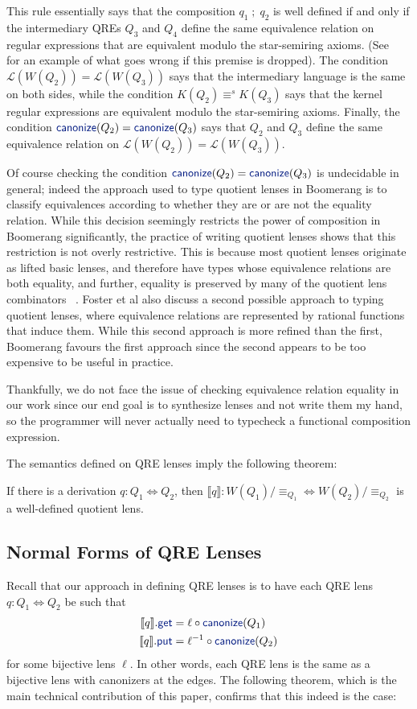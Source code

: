 \documentclass[acmsmall,review,anonymous]{acmart}
\newcommand{\kw}[1]{\textcolor{dkblue}{\ensuremath{\mathsf{#1}}}}
\newcommand{\eqrel}[1]{\ensuremath{\equiv_{#1}}}
\newcommand{\canonize}{\ensuremath{\kw{canonize}}}
\newcommand{\get}{\ensuremath{\kw{get}}}
\newcommand{\lput}{\ensuremath{\kw{put}}}
\begin{document}
This rule essentially says that the composition $q_1 \; ; \; q_2$ is well
defined if and only if the intermediary QREs $Q_3$ and $Q_4$ define the same
equivalence relation on regular expressions that are equivalent modulo the
star-semiring axioms. (See~\cite[\S 4]{quotientlenses} for an example of what
goes wrong if this premise is dropped). The condition $\mathcal{L}(W(Q_2)) =
\mathcal{L}(W(Q_3))$ says that the intermediary language is the same on both
sides, while the condition $K(Q_2) \equiv^s K(Q_3)$ says that the kernel
regular expressions are equivalent modulo the star-semiring axioms. Finally,
the condition $\canonize(Q_2) = \canonize(Q_3)$ says that $Q_2$ and $Q_3$
define the same equivalence relation on $\mathcal{L}(W(Q_2))=
\mathcal{L}(W(Q_3))$.

Of course checking the condition $\canonize(Q_2) = \canonize(Q_3)$ is
undecidable in general; indeed the approach used to type quotient lenses in
Boomerang is to classify equivalences according to whether they are or are not
the equality relation. While this decision seemingly restricts the
power of composition in Boomerang significantly, the practice of writing
quotient lenses shows that this restriction is not overly restrictive. This is 
because most quotient lenses originate as lifted basic lenses, and
therefore have types whose equivalence relations are both equality, and further,
equality is preserved by many of the quotient lens combinators
~\cite{quotientlenses}. Foster et al also discuss a second possible approach to
typing quotient lenses, where equivalence relations are represented by rational
functions that induce them. While this second approach is more refined than the
first, Boomerang favours the first approach since the second appears to be too
expensive to be useful in practice. 

Thankfully, we do not face the issue of checking equivalence relation equality
in our work since our end goal is to synthesize lenses and not write them my
hand, so the programmer will never actually need to typecheck a functional
composition expression.

The semantics defined on QRE lenses imply the following theorem:
\begin{theorem}
If there is a derivation $q : Q_1 \Leftrightarrow Q_2$, then $\llbracket q
\rrbracket : W(Q_1)/{\eqrel{Q_1}} \Leftrightarrow W(Q_2)/{\eqrel{Q_2}}$ is a
well-defined quotient lens.
\end{theorem}
\subsection{Normal Forms of QRE Lenses}
Recall that our approach in defining QRE lenses is to have each QRE lens $q: Q_1
\Leftrightarrow Q_2$ be such that
\begin{align*}
\llbracket q \rrbracket.\get &= \ell \circ \canonize(Q_1)\\
\llbracket q \rrbracket.\lput &= \ell^{-1} \circ \canonize(Q_2)
\end{align*}
for some bijective lens $\ell$. In other words, each QRE lens is the same as a
bijective lens with canonizers at the edges. The following theorem,
which is the main technical contribution of this paper, confirms that this
indeed is the case:
\end{document}
